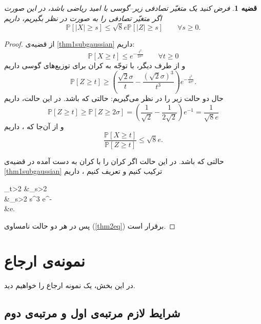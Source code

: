\documentclass[BScThesis, onesided]{thesis}
\newtheorem{theorem}{قضیه}[chapter]
\newcommand{\E}{\mathbb{E}}
\newcommand{\Prob}{\mathbb{P}}
\newcommand{\Nd}{\mathcal{N}}
\begin{document}
	\begin{theorem}\label{thm2subgaussian}
		فرض کنید 
		یک متغیّر تصادفی زیر--گوسی با امید ریاضی
		\lr{$\E[X]=0$}
		باشد، در این صورت اگر متغیّر تصادفی 
		را به صورت
		\lr{$Z\sim \Nd(0,2\sigma^2)$}
		در نظر بگیریم، داریم
		\begin{equation}
		\Prob[|X|\geq s] \leq \sqrt{8}e \Prob[|Z|\geq s] \qquad \forall s \geq 0.
		\label{thm2eq}
		\end{equation}
	\end{theorem}
	\begin{proof}
		از قضیه‌ی
		\ref{thm1subgaussian}
		داریم:
		\[\Prob[X\geq t] \leq e^{-\frac{t^2}{2\sigma^2}}\qquad \forall t\geq0\]
		و از طرف دیگر، با توجّه به کران
		برای توزیع‌های گوسی داریم
		\[\Prob[Z\geq t] \geq\left(\frac{\sqrt{2}\sigma}{t} - \frac{(\sqrt{2}\sigma)^3}{t^3} \right) e^{-\frac{t^2}{4\sigma^2}}.\]
		حال دو حالت زیر را در نظر می‌گیریم:	
		حالتی که 
		باشد. در این حالت، داریم
		\[\Prob[Z\geq t] \geq \Prob[Z\geq 2\sigma] = \left(\frac{1}{\sqrt{2}} - \frac{1}{2\sqrt{2}} \right) e^{-1} = \frac{1}{\sqrt{8}e}\]
		و از آن‌جا که
		\lr{$\Prob[X\geq t] \leq 1$}،
		داریم
		\[\frac{\Prob[X\geq t]}{\Prob[Z\geq t]} \leq \sqrt{8}e.\]
		
		
		حالتی که
		باشد. در این حالت اگر کران
		را با کران به دست آمده در قضیه‌ی
		\ref{thm1subgaussian}
		ترکیب کنیم و تعریف کنیم
		،
		داریم
		\begin{flalign*}
		\sup_{t>2\sigma} \frac{\Prob[X\geq t]}{\Prob[Z\geq t]} &\leq \sup_{s>2}\\
		&\leq \sup_{s>2} s^3 e^{-}\\
		&\leq {}e.
		\end{flalign*}
		پس در هر دو حالت نامساوی
		(\ref{thm2eq})
		برقرار است.		
	\end{proof}
	
\section{نمونه‌ی ارجاع}

در این بخش، یک نمونه ارجاع را خواهیم دید.

\subsection{شرایط لازم مرتبه‌ی اول و مرتبه‌ی دوم }
\end{document}
